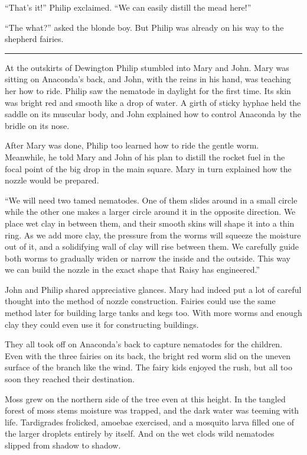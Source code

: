 \documentclass[10pt]{memoir}
\renewcommand{\pfbreakdisplay}{\bigskip \ding{166} \bigskip}
\newcommand{\secbreak}{\fancybreak{\pfbreakdisplay}}
\begin{document}
``That's it!'' Philip exclaimed. ``We can easily distill the mead here!''

``The what?'' asked the blonde boy. But Philip was already on his way to the
shepherd fairies.

\secbreak

At the outskirts of Dewington Philip stumbled into Mary and John. Mary was
sitting on Anaconda's back, and John, with the reins in his hand, was teaching
her how to ride. Philip saw the nematode in daylight for the first time. Its
skin was bright red and smooth like a drop of water. A girth of sticky hyphae
held the saddle on its muscular body, and John explained how to control
Anaconda by the bridle on its nose.

After Mary was done, Philip too learned how to ride the gentle worm. Meanwhile,
he told Mary and John of his plan to distill the rocket fuel in the focal point
of the big drop in the main square. Mary in turn explained how the nozzle would
be prepared.

``We will need two tamed nematodes. One of them slides around in a small circle
while the other one makes a larger circle around it in the opposite direction.
We place wet clay in between them, and their smooth skins will shape it into a
thin ring. As we add more clay, the pressure from the worms will squeeze the
moisture out of it, and a solidifying wall of clay will rise between them. We
carefully guide both worms to gradually widen or narrow the inside and the
outside. This way we can build the nozzle in the exact shape that Raisy has
engineered.''

John and Philip shared appreciative glances. Mary had indeed put a lot of
careful thought into the method of nozzle construction. Fairies could use the
same method later for building large tanks and kegs too. With more worms and
enough clay they could even use it for constructing buildings.

They all took off on Anaconda's back to capture nematodes for the children.
Even with the three fairies on its back, the bright red worm slid on the uneven
surface of the branch like the wind. The fairy kids enjoyed the rush, but all
too soon they reached their destination.

Moss grew on the northern side of the tree even at this height. In the tangled
forest of moss stems moisture was trapped, and the dark water was teeming with
life. Tardigrades frolicked, amoebae exercised, and a mosquito larva filled one
of the larger droplets entirely by itself. And on the wet clods wild nematodes
slipped from shadow to shadow.
\end{document}

